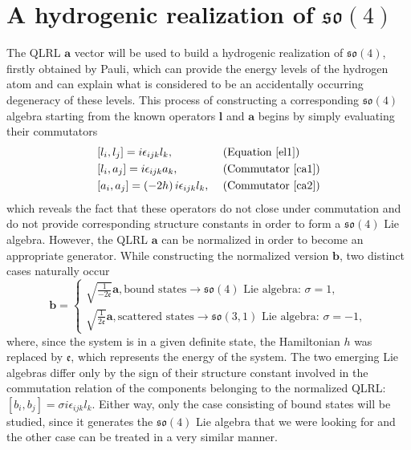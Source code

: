 \documentclass[12pt,a4paper]{report}
\theoremstyle{definition}
\theoremstyle{remark}
\theoremstyle{remark}
\begin{document}
\section{A hydrogenic realization of $\mathfrak{so}(4)$}
The QLRL $\textbf{a}$ vector will be used to build a hydrogenic realization of $\mathfrak{so}(4)$, firstly obtained by Pauli, which can provide the energy levels of the hydrogen atom and can explain what is considered to be an accidentally occurring degeneracy of these levels. This process of constructing a corresponding $\mathfrak{so}(4)$ algebra starting from the known operators $\textbf{l}$ and $\textbf{a}$ begins by simply evaluating their commutators
\begin{equation*}
\begin{aligned}
&[l_i,l_j]=i\epsilon_{ijk}l_k, &&\text{ (Equation~\ref{el1})} \\
&[l_i,a_j]=i\epsilon_{ijk}a_k, &&\text{ (Commutator~\ref{ca1})} \\
&[a_i,a_j]=\left(-2h\right)i\epsilon_{ijk}l_k, &&\text{ (Commutator~\ref{ca2})}
\end{aligned}
\end{equation*}
which reveals the fact that these operators do not close under commutation and do not provide corresponding structure constants in order to form a $\mathfrak{so}(4)$ Lie algebra. However, the QLRL $\textbf{a}$ can be normalized in order to become an appropriate generator. While constructing the normalized version $\textbf{b}$, two distinct cases naturally occur
\begin{equation}\label{eso4.1}
\textbf{b}=\left\{
\begin{array}{ll}
\sqrt{\frac{1}{-2\mathfrak{e}}}\textbf{a},\text{bound states}\rightarrow \mathfrak{so}(4) \text{ Lie algebra: }\sigma=1,\\
\sqrt{\frac{1}{2\mathfrak{e}}}\textbf{a},\text{scattered states}\rightarrow \mathfrak{so}(3,1) \text{ Lie algebra: }\sigma=-1,
\end{array}
\right.
\end{equation}
where, since the system is in a given definite state, the Hamiltonian $h$ was replaced by $\mathfrak{e}$, which represents the energy of the system. The two emerging Lie algebras differ only by the sign of their structure constant involved in the commutation relation of the components belonging to the normalized QLRL: $[b_i,b_j]=\sigma i\epsilon_{ijk}l_k$. Either way, only the case consisting of bound states will be studied, since it generates the $\mathfrak{so}(4)$ Lie algebra that we were looking for and the other case can be treated in a very similar manner. \\ \indent
\end{document}

